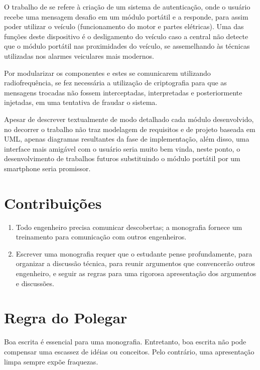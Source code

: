 O trabalho de \textcite{alfonso:2006} se refere à criação de um sistema de autenticação, onde o usuário recebe uma mensagem desafio em um módulo portátil e a responde, para assim poder utilizar o veículo (funcionamento do motor e partes elétricas). Uma das funções deste dispositivo é o desligamento do veículo caso a central não detecte que o módulo portátil nas proximidades do veículo, se assemelhando às técnicas utilizadas nos alarmes veiculares mais modernos.

Por modularizar os componentes e estes se comunicarem utilizando radiofrequência,
se fez necessária a utilização de criptografia para que as mensagens trocadas não 
fossem interceptadas, interpretadas e posteriormente injetadas, em uma tentativa 
de fraudar o sistema. 

Apesar de descrever textualmente de modo detalhado cada módulo desenvolvido, no decorrer o trabalho não traz modelagem de requisitos e de projeto baseada em UML, apenas diagramas resultantes da fase de implementação, além disso, uma interface mais amigável com o usuário seria muito bem vinda, neste ponto, o desenvolvimento de trabalhos futuros substituindo o módulo portátil por um smartphone seria promissor.


\section{Contribui\c{c}\~{o}es}

\begin{enumerate}

	\item Todo engenheiro precisa comunicar descobertas; a monografia fornece um treinamento para comunicação com outros engenheiros.

	\item Escrever uma monografia requer que o estudante pense profundamente, para organizar a discussão técnica, para reunir argumentos que convencerão outros engenheiro,
	e seguir as regras para uma rigorosa apresentação dos argumentos e discussões.

\end{enumerate}

\section{Regra do Polegar}

Boa escrita é essencial para uma monografia. Entretanto, boa escrita não pode compensar uma escassez de idéias ou conceitos.
Pelo contrário, uma apresentação limpa sempre expõe fraquezas.

